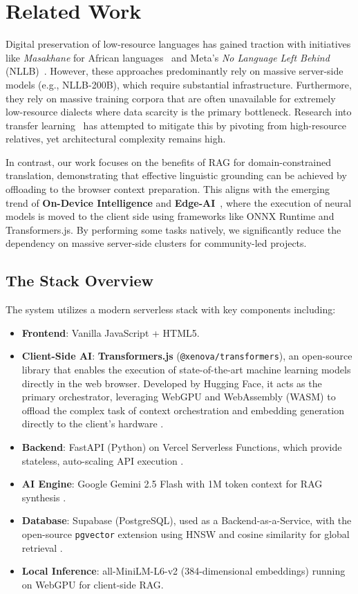 \documentclass[12pt]{article}
\begin{document}
\section{Related Work}

Digital preservation of low-resource languages has gained traction with initiatives like \textit{Masakhane} for African languages~\cite{nekoto2020participatory} and Meta's \textit{No Language Left Behind} (NLLB)~\cite{nllb2022no}. However, these approaches predominantly rely on massive server-side models (e.g., NLLB-200B), which require substantial infrastructure. Furthermore, they rely on massive training corpora that are often unavailable for extremely low-resource dialects where data scarcity is the primary bottleneck. Research into transfer learning~\cite{zoph2016transfer} has attempted to mitigate this by pivoting from high-resource relatives, yet architectural complexity remains high.

In contrast, our work focuses on the benefits of RAG for domain-constrained translation, demonstrating that effective linguistic grounding can be achieved by offloading to the browser context preparation. This aligns with the emerging trend of \textbf{On-Device Intelligence} and \textbf{Edge-AI}~\cite{gitnation}, where the execution of neural models is moved to the client side using frameworks like ONNX Runtime and Transformers.js. By performing some tasks natively, we significantly reduce the dependency on massive server-side clusters for community-led projects.

\subsection{The Stack Overview}
The system utilizes a modern serverless stack with key components including:
\begin{itemize}
    \item \textbf{Frontend}: Vanilla JavaScript + HTML5.
    \item \textbf{Client-Side AI}: \textbf{Transformers.js} (\texttt{@xenova/transformers}), an open-source library that enables the execution of state-of-the-art machine learning models directly in the web browser. Developed by Hugging Face, it acts as the primary orchestrator, leveraging WebGPU and WebAssembly (WASM) to offload the complex task of context orchestration and embedding generation directly to the client's hardware \cite{transformersjs}.
    \item \textbf{Backend}: FastAPI (Python) on Vercel Serverless Functions, which provide stateless, auto-scaling API execution \cite{vercel_platform}.
    \item \textbf{AI Engine}: Google Gemini 2.5 Flash with 1M token context for RAG synthesis \cite{gemini_release}.
    \item \textbf{Database}: Supabase (PostgreSQL), used as a Backend-as-a-Service, with the open-source \texttt{pgvector} extension using HNSW and cosine similarity for global retrieval \cite{supabase_hnsw}.
    \item \textbf{Local Inference}: all-MiniLM-L6-v2 (384-dimensional embeddings) running on WebGPU for client-side RAG.
\end{itemize}
 
\end{document}
